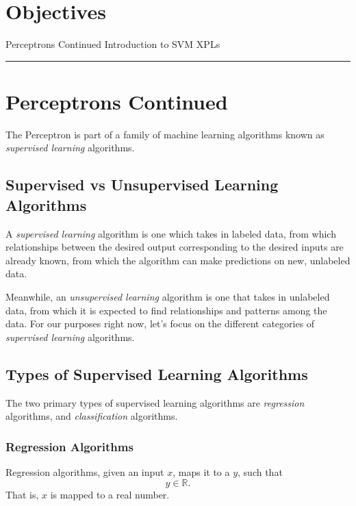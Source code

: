 \section*{Objectives}
\begin{outline}
    \1 Perceptrons Continued
    \1 Introduction to SVM
    \1 XPLs
\end{outline}

\rule[0.0051in]{\textwidth}{0.00025in}

\section{Perceptrons Continued}
The Perceptron is part of a family of machine learning algorithms known as \textit{supervised learning} algorithms.

\subsection{Supervised vs Unsupervised Learning Algorithms}
A \textit{supervised learning} algorithm is one which takes in labeled data, from which relationships between the desired output corresponding to the desired inputs are already known, from which the algorithm can make predictions on new, unlabeled data.

Meanwhile, an \textit{unsupervised learning} algorithm is one that takes in unlabeled data, from which it is expected to find relationships and patterns among the data. For our purposes right now, let's focus on the different categories of \textit{supervised learning} algorithms.

\subsection{Types of Supervised Learning Algorithms}
The two primary types of supervised learning algorithms are \textit{regression} algorithms, and \textit {classification} algorithms.

\subsubsection{Regression Algorithms}
Regression algorithms, given an input $x$, maps it to a $y$, such that
\[
    y \in \mathbb{R}.
\]
That is, $x$ is mapped to a real number.

